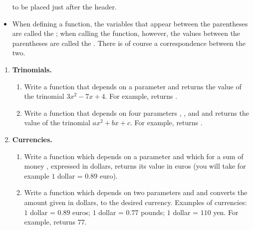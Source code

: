 \documentclass[11pt,class=report,crop=false]{standalone}
\begin{document}
\begin{cours}
\begin{itemize}
  to be placed just after the header.

  
  \item When defining a function, the variables that appear between the parentheses are called the ; when calling the function, however, the values between the parentheses are called the . There is of course a correspondence between the two.


\end{itemize}
\end{cours}



\begin{activite}


\begin{enumerate}
  \item \textbf{Trinomials.}
  
  \begin{enumerate}
    \item Write a function  that depends on a parameter  and returns the value of the trinomial $3x^2-7x+4$. For example,  returns .
    
    \item Write a function  that depends on four parameters , ,  and  and returns the value of the trinomial $ax^2+bx+c$. For example,  returns .
  \end{enumerate}   
  
  
  \item \textbf{Currencies.}
  
   \begin{enumerate}
    \item Write a function  which depends on a parameter and which for a sum of money , expressed in dollars, returns its value in euros (you will take for example $1$ dollar = $0.89$ euro).
    
    \item Write a function  which depends on two parameters  and  and converts the amount given in dollars, to the desired currency.
    Examples of currencies: 
    $1$ dollar = $0.89$ euros;
    $1$ dollar = $0.77$ pounds;
    $1$ dollar = $110$ yen.
    For example,  returns $77$.   
    

\end{enumerate}
\end{enumerate}
\end{activite}
\end{document}
